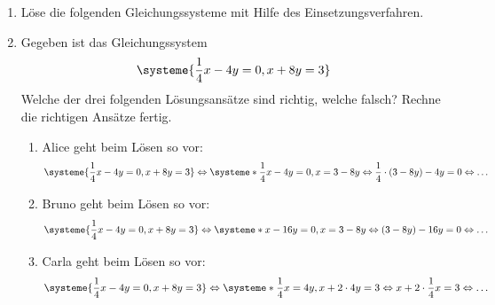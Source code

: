 \documentclass[11pt,oneside]{article}
\begin{document}
	\begin{aufgabe}
		\begin{enumerate}
			\item Löse die folgenden Gleichungssysteme mit Hilfe des Einsetzungsverfahren.
			\item Gegeben ist das Gleichungssystem \[\systeme{\frac{1}{4}x-4y=0,x+8y=3}\] Welche der drei folgenden Lösungsansätze sind richtig, welche falsch? Rechne die richtigen Ansätze fertig.\newline
			\begin{enumerate}[label=\alph*)]
				\item Alice geht beim Lösen so vor: \[\systeme{\frac{1}{4}x-4y=0,x+8y=3}\Leftrightarrow\systeme*{\frac{1}{4}x-4y=0,x=3-8y}\Leftrightarrow \frac{1}{4}\*(3-8y)-4y=0\Leftrightarrow\ldots\]
				\item Bruno geht beim Lösen so vor: \[\systeme{\frac{1}{4}x-4y=0,x+8y=3}\Leftrightarrow\systeme*{x-16y=0,x=3-8y}\Leftrightarrow (3-8y)-16y=0\Leftrightarrow\ldots\]
				\item Carla geht beim Lösen so vor: \[\systeme{\frac{1}{4}x-4y=0,x+8y=3}\Leftrightarrow\systeme*{\frac{1}{4}x=4y,x+2\*4y=3}\Leftrightarrow x+2\*\frac{1}{4}x=3\Leftrightarrow\ldots\]
			\end{enumerate}
		\end{enumerate}
	\end{aufgabe}
\end{document}

